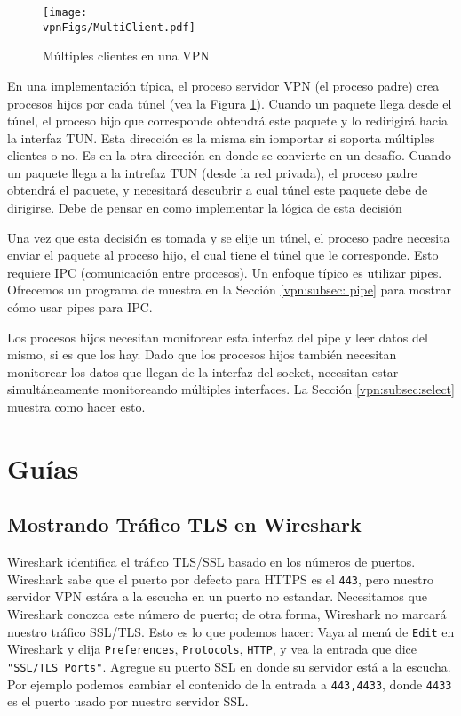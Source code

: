 \begin{figure}[htb]
\begin{center}
\texttt{[image: \\vpnFigs/MultiClient.pdf]}
\end{center}
\caption{Múltiples clientes en una VPN}
\label{vpn:fig:MultiClient}
\end{figure}
 
En una implementación típica, el proceso servidor VPN (el proceso padre) crea procesos hijos por cada túnel (vea la Figura \ref{vpn:fig:MultiClient}).
Cuando un paquete llega desde el túnel, el proceso hijo que corresponde obtendrá este paquete y lo redirigirá hacia la interfaz TUN.
Esta dirección es la misma sin iomportar si soporta múltiples clientes o no. Es en la otra dirección en donde se convierte en un desafío.
Cuando un paquete llega a la intrefaz TUN (desde la red privada), el proceso padre obtendrá el paquete, y necesitará descubrir a cual túnel este paquete debe de dirigirse. Debe de pensar en como implementar la lógica de esta decisión

Una vez que esta decisión es tomada y se elije un túnel, el proceso padre necesita enviar el paquete al proceso hijo, el cual tiene el túnel que le corresponde. Esto requiere IPC (comunicación entre procesos).
Un enfoque típico es utilizar pipes. Ofrecemos un programa de muestra en la Sección \ref{vpn:subsec: pipe} para mostrar cómo usar pipes para IPC.

Los procesos hijos necesitan monitorear esta interfaz del pipe y leer datos del mismo, si es que los hay. Dado que los procesos hijos también necesitan monitorear los datos que llegan de la interfaz del socket, necesitan estar simultáneamente monitoreando múltiples interfaces.
La Sección \ref{vpn:subsec:select} muestra como hacer esto.


\section{Guías}


\subsection{Mostrando Tráfico TLS en Wireshark}

Wireshark identifica el tráfico TLS/SSL basado en los números de puertos. Wireshark sabe que el puerto por defecto para HTTPS es el \texttt{443}, pero nuestro servidor VPN estára a la escucha en un puerto no estandar.
Necesitamos que Wireshark conozca este número de puerto; de otra forma, Wireshark no marcará nuestro tráfico SSL/TLS. Esto es lo que podemos hacer:
Vaya al menú de \texttt{Edit} en Wireshark y elija \texttt{Preferences}, \texttt{Protocols}, \texttt{HTTP}, y vea la entrada que dice \texttt{"SSL/TLS Ports"}. Agregue su puerto SSL en donde su servidor está a la escucha.
Por ejemplo podemos cambiar el contenido de la entrada a \texttt{443,4433}, donde  \texttt{4433} es el puerto usado por nuestro servidor SSL.


